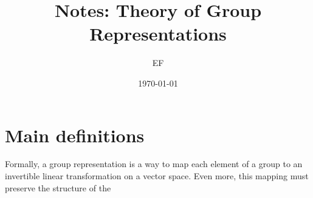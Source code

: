 \documentclass[11pt]{article}
\title{Notes: Theory of Group Representations}
\author{EF}
\date{\today}
\begin{document}
\maketitle

\section{Main definitions}
Formally, a group representation is a way to map each element of a group to an invertible linear transformation on a vector space. Even more, this mapping must preserve the structure of the 
\end{document}
